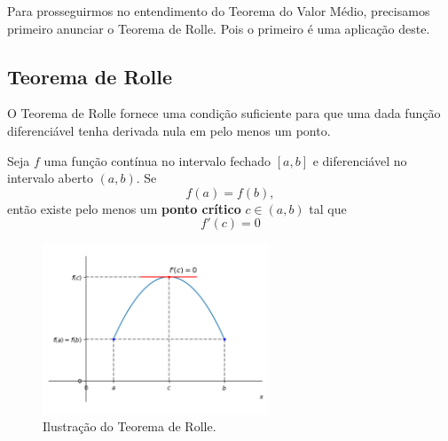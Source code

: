 \cleardoublepage\documentclass[../main.tex]{subfiles}
\begin{document}
Para prosseguirmos no entendimento do Teorema do Valor Médio, precisamos primeiro anunciar o Teorema de Rolle. Pois o primeiro é uma aplicação deste.

\subsection{Teorema de Rolle}

O Teorema de Rolle fornece uma condição suficiente para que uma dada função diferenciável tenha derivada nula em pelo menos um ponto.

\begin{framed}
\begin{teo}\label{teo:TeoremaRoole}
  Seja $f$ uma função contínua no intervalo fechado $[a, b]$ e diferenciável no intervalo aberto $(a, b)$. Se
  \begin{equation}
    f(a)=f(b),
  \end{equation}
  então existe pelo menos um {\bf ponto crítico} $c\in (a, b)$ tal que
  \begin{equation}
    f'(c)=0
  \end{equation}
\end{teo}\end{framed}
\begin{figure}[!htb]
  \centering
  \includegraphics[width=0.6\textwidth]{./fig_apl_deriv/fig_teo_Rolle}
  \caption{Ilustração do Teorema de Rolle.}
  \label{fig:teo_Rolle}
\end{figure}
\end{document}
